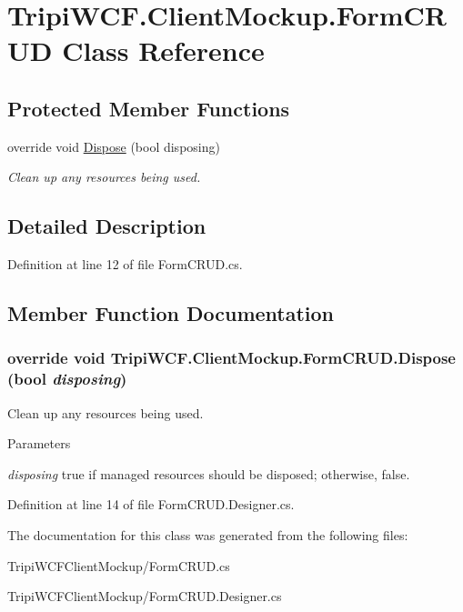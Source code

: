 \hypertarget{class_tripi_w_c_f_1_1_client_mockup_1_1_form_c_r_u_d}{
\section{TripiWCF.ClientMockup.FormCRUD Class Reference}
\label{class_tripi_w_c_f_1_1_client_mockup_1_1_form_c_r_u_d}
}
\subsection*{Protected Member Functions}
\begin{DoxyCompactItemize}
\item 
override void \hyperlink{class_tripi_w_c_f_1_1_client_mockup_1_1_form_c_r_u_d_af9ac20420ca3ab6c4c5e974b36513914}{Dispose} (bool disposing)
\begin{DoxyCompactList}\small\item\em Clean up any resources being used. \item\end{DoxyCompactList}\end{DoxyCompactItemize}


\subsection{Detailed Description}


Definition at line 12 of file FormCRUD.cs.

\subsection{Member Function Documentation}
\hypertarget{class_tripi_w_c_f_1_1_client_mockup_1_1_form_c_r_u_d_af9ac20420ca3ab6c4c5e974b36513914}{
\subsubsection[{Dispose}]{\setlength{\rightskip}{0pt plus 5cm}override void TripiWCF.ClientMockup.FormCRUD.Dispose (bool {\em disposing})}}
\label{class_tripi_w_c_f_1_1_client_mockup_1_1_form_c_r_u_d_af9ac20420ca3ab6c4c5e974b36513914}


Clean up any resources being used. 
\begin{DoxyParams}{Parameters}
\item[{\em disposing}]true if managed resources should be disposed; otherwise, false.\end{DoxyParams}


Definition at line 14 of file FormCRUD.Designer.cs.

The documentation for this class was generated from the following files:\begin{DoxyCompactItemize}
\item 
TripiWCFClientMockup/FormCRUD.cs\item 
TripiWCFClientMockup/FormCRUD.Designer.cs\end{DoxyCompactItemize}
